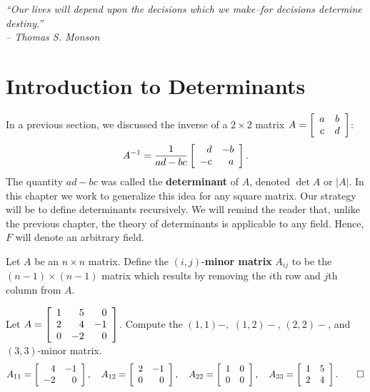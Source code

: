 \begin{center} 
\emph{``Our lives will depend upon the decisions which we make--for decisions determine destiny.'' \\-- Thomas S. Monson}
\end{center}

\section{Introduction to Determinants}\label{sec:deter}
In a previous section, we discussed the inverse of a $2\times 2$ matrix $A = \mtx{cc}{a&b\\c&d}$:
\[A^{-1} = \dfrac{1}{ad-bc}\mtx{rr}{d&-b\\-c&a}.\] The quantity $ad-bc$ was called the \textbf{determinant} of $A$, denoted $\det A$ or $|A|$. In this chapter we work to generalize this idea for any square matrix. Our strategy will be to define determinants recursively. We will remind the reader that, unlike the previous chapter, the theory of determinants is applicable to any field. Hence, $F$ will denote an arbitrary field. \\

\begin{Def} Let $A$ be an $n\times n$ matrix. Define the $(i,j)$-\textbf{minor matrix} $A_{ij}$ to be the $(n-1)\times (n-1)$ matrix which results by removing the $i$th row and $j$th column from $A$.
\end{Def}\vs

%

\begin{Exam} Let $A = \mtx{rrr}{1&5&0\\2&4&-1\\0&-2&0}$. Compute the $(1,1)-,$ $(1,2)-$, $(2,2)-$, and $(3,3)$-minor matrix.\\

\[A_{11} = \mtx{rr}{4&-1\\-2&0}, \quad A_{12} = \mtx{rr}{2&-1\\0&0},\quad A_{22} = \mtx{rr}{1&0\\0&0}, \quad A_{33} = \mtx{rr}{1&5\\2&4}. \qedhere\]
\end{Exam}\vs

